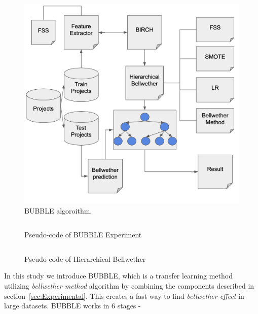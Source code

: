 \documentclass[10pt,journal,compsoc]{IEEEtran}
\begin{document}
\begin{figure}
    \centering
    \includegraphics[width=\linewidth]{figs/BUBBLE.png}
    \caption{BUBBLE algoroithm.}
    \label{fig:BUBBLE}
\end{figure}


{\small 
{\small 
\begin{figure}[]
    \small
    \inputminted[numbersep=1pt, linenos=true, fontsize=\small]{python}{pseudocode/bubble.py}
    \vspace{-0.2cm}
    \caption{Pseudo-code of BUBBLE Experiment}
    \label{fig:GAP_pseudocode} 
    \vspace{-0.3cm}
\end{figure}
}
}
{\small 
{\small 
\begin{figure}[]
        \begin{minipage}{\linewidth}
            \inputminted[numbersep=2pt, linenos=true, fontsize=\small]{python}{pseudocode/heirarchical_bellw.py}
        \end{minipage}
    \vspace{-0.2cm}
    \caption{Pseudo-code of Hierarchical Bellwether}
    \label{fig:GAP_pseudocode} 
    \vspace{-0.3cm}
\end{figure}
}
}
In this study we introduce BUBBLE, which is a transfer learning method utilizing \textit{bellwether method} algorithm by combining the components described in section~\ref{sec:Experimental}.  This creates a fast way to find \textit{bellwether effect} in large datasets. BUBBLE works in 6 stages - 
\end{document}

